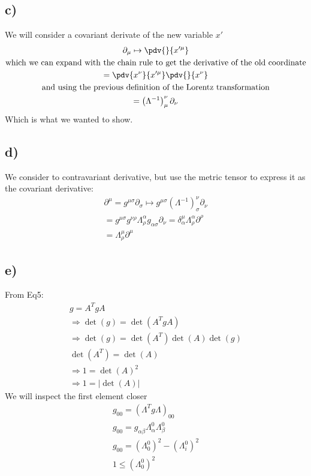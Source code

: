 \documentclass[]{scrartcl}
\begin{document}
\subsection{c)}

We will consider a covariant derivate of the new variable $x'$
\begin{gather}
	\partial_\mu\mapsto \pdv{}{x'^\mu}\\
	\text{which we can expand with the chain rule to get the derivative of the old coordinate}\\
	=\pdv{x^\nu}{x'^\mu}\pdv{}{x^\nu}\\
	\text{and using the previous definition of the Lorentz transformation}\\
	=\left(\Lambda^{-1}\right)^\nu_\mu \partial_\nu
\end{gather}
Which is what we wanted to show.

\subsection{d)}

We consider to contravariant derivative, but use the metric tensor to express it as the covariant derivative:
\begin{gather}
	\partial^\mu = g^{\mu\sigma}\partial_\sigma \mapsto g^{\mu\sigma} \left(\Lambda^{-1}\right)^\nu_\sigma \partial_\nu\\
	= g^{\mu\sigma}g^{\nu\rho}\Lambda^\alpha_\rho g_{\alpha\sigma}\partial_\nu = \delta^\mu_\alpha \Lambda^\alpha_\rho \partial^\rho\\
	= \Lambda^\mu_\rho\partial^\mu
\end{gather}

\subsection{e)}
From Eq5:
\begin{gather}
	g = A^T gA\\
	\Rightarrow \det(g) = \det(A^T g A)\\
	\Rightarrow \det(g) = \det(A^T)\det(A)\det(g)\\
	\det(A^T) = \det(A)\nonumber\\
	\Rightarrow 1 = \det(A)^2\\
	\Rightarrow 1 = |\det(A)|
\end{gather}
We will inspect the first element closer
\begin{gather}
	g_{00} = \left(\Lambda^T g \Lambda\right)_{00}\\
	g_{00} = g_{\alpha\beta}\Lambda^0_\alpha\Lambda^0_\beta\\
	g_{00} = \left(\Lambda^0_0\right)^2 -\left(\Lambda^0_i\right)^2\\
	1 \leq \left(\Lambda^0_0\right)^2
\end{gather}
\end{document}
